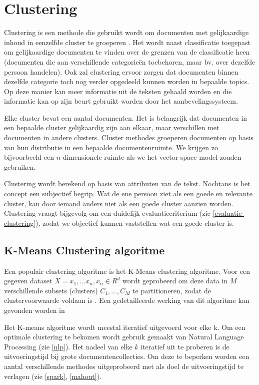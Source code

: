 \section{Clustering}
Clustering is een methode die gebruikt wordt om documenten met gelijkaardige inhoud in eenzelfde cluster te groeperen \cite{Hotho2005}. Het wordt naast classificatie toegepast om gelijkaardige documenten te vinden over de grenzen van de classificatie heen (documenten die aan verschillende categorie\"en toebehoren, maar bv. over dezelfde persoon handelen). Ook zal clustering ervoor zorgen dat documenten binnen dezelfde categorie toch nog verder opgedeeld kunnen worden in bepaalde topics. Op deze manier kan meer informatie uit de teksten gehaald worden en die informatie kan op zijn beurt gebruikt worden door het aanbevelingssysteem. 

Elke cluster bevat een aantal documenten. Het is belangrijk dat documenten in een bepaalde cluster gelijkaardig zijn aan elkaar, maar verschillen met documenten in andere clusters. Cluster methodes groeperen documenten op basis van hun distributie in een bepaalde documentenruimte. We krijgen zo bijvoorbeeld een $n$-dimensionele ruimte als we het vector space model zouden gebruiken.

Clustering wordt berekend op basis van attributen van de tekst. Nochtans is het concept  een subjectief begrip. Wat de ene persoon ziet als een goede en relevante cluster, kan door iemand anders niet als een goede cluster aanzien worden. Clustering vraagt bijgevolg om een duidelijk evaluatiecriterium (zie \ref{evaluatie-clustering}), zodat we objectief kunnen vaststellen wat een goede cluster is.

\subsection{K-Means Clustering algoritme}
Een populair clustering algoritme is het K-Means clustering algoritme. Voor een gegeven dataset $X = {x_1,...x_n}, x_n \in R^d$ wordt geprobeerd om deze data in $M$ verschillende subsets (clusters) $C_1,...,C_M$ te partitioneren, zodat de clustervoorwaarde voldaan is \cite{Likas2011}. Een gedetailleerde werking van dit algoritme kan gevonden worden in 

Het K-means algoritme wordt meestal iteratief uitgevoerd voor elke k. Om een optimale clustering te bekomen wordt gebruik gemaakt van Natural Language Processing (zie \ref{nlp}). Het nadeel van elke $k$ iteratief uit te proberen is de uitvoeringstijd bij grote documentencollecties. Om deze te beperken worden een aantal verschillende methodes uitgeprobeerd met als doel de uitvoeringstijd te verlagen (zie \ref{spark}, \ref{mahout}).

